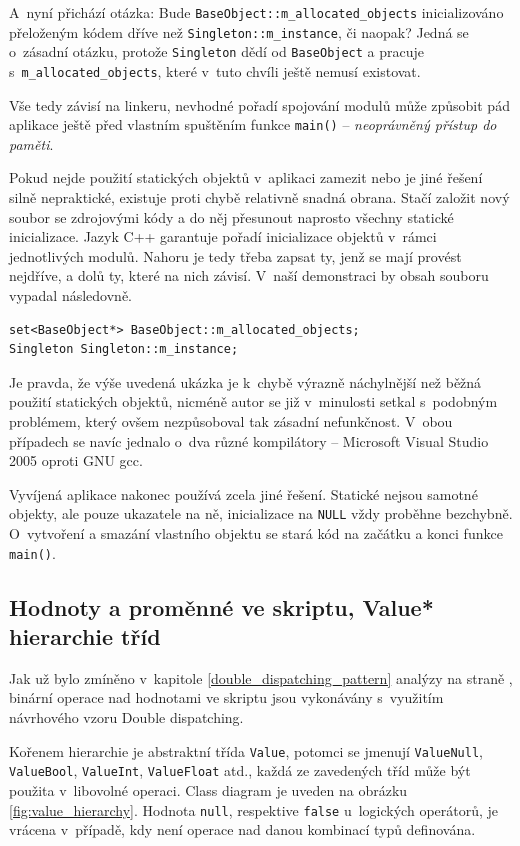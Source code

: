 \documentclass[11pt,twoside,a4paper]{book}
\begin{document}
A~nyní přichází otázka: Bude \texttt{BaseObject::m\_allocated\_objects} inicializováno přeloženým kódem dříve než \texttt{Singleton::m\_instance}, či naopak? Jedná se o~zásadní otázku, protože \texttt{Singleton} dědí od \texttt{BaseObject} a pracuje s~\texttt{m\_allocated\_objects}, které v~tuto chvíli ještě nemusí existovat.

Vše tedy závisí na linkeru, nevhodné pořadí spojování modulů může způsobit pád aplikace ještě před vlastním spuštěním funkce \texttt{main()} -- \textit{neoprávněný přístup do paměti}.

Pokud nejde použití statických objektů v~aplikaci zamezit nebo je jiné řešení silně nepraktické, existuje proti chybě relativně snadná obrana. Stačí založit nový soubor se zdrojovými kódy a do něj přesunout naprosto všechny statické inicializace. Jazyk C++ garantuje pořadí inicializace objektů v~rámci jednotlivých modulů. Nahoru je tedy třeba zapsat ty, jenž se mají provést nejdříve, a dolů ty, které na nich závisí. V~naší demonstraci by obsah souboru vypadal následovně.

\begin{verbatim}
set<BaseObject*> BaseObject::m_allocated_objects;
Singleton Singleton::m_instance;
\end{verbatim}

Je pravda, že výše uvedená ukázka je k~chybě výrazně náchylnější než běžná použití statických objektů, nicméně autor se již v~minulosti setkal s~podobným problémem, který ovšem nezpůsoboval tak zásadní nefunkčnost. V~obou případech se navíc jednalo o~dva různé kompilátory -- Microsoft Visual Studio 2005 oproti GNU gcc.

Vyvíjená aplikace nakonec používá zcela jiné řešení. Statické nejsou samotné objekty, ale pouze ukazatele na ně, inicializace na \texttt{NULL} vždy proběhne bezchybně. O~vytvoření a smazání vlastního objektu se stará kód na začátku a konci funkce \texttt{main()}.


\subsection{Hodnoty a proměnné ve skriptu, Value* hierarchie tříd}

Jak už bylo zmíněno v~kapitole \ref{double_dispatching_pattern} analýzy na straně \pageref{double_dispatching_pattern}, binární operace nad hodnotami ve skriptu jsou vykonávány s~využitím návrhového vzoru Double dispatching.

Kořenem hierarchie je abstraktní třída \texttt{Value}, potomci se jmenují \texttt{ValueNull}, \texttt{Va\-lue\-Bool}, \texttt{ValueInt}, \texttt{ValueFloat} atd., každá ze zavedených tříd může být použita v~libovolné operaci. Class diagram je uveden na obrázku \ref{fig:value_hierarchy}. Hodnota \texttt{null}, respektive \texttt{false} u~logických operátorů, je vrácena v~případě, kdy není operace nad danou kombinací typů definována.
\end{document}
